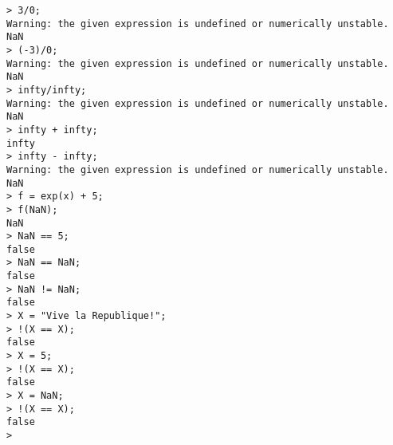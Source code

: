 \begin{center}\begin{minipage}{15cm}\begin{Verbatim}[frame=single]
> 3/0;
Warning: the given expression is undefined or numerically unstable.
NaN
> (-3)/0;
Warning: the given expression is undefined or numerically unstable.
NaN
> infty/infty;
Warning: the given expression is undefined or numerically unstable.
NaN
> infty + infty;
infty
> infty - infty;
Warning: the given expression is undefined or numerically unstable.
NaN
> f = exp(x) + 5;
> f(NaN);
NaN
> NaN == 5;
false
> NaN == NaN;
false
> NaN != NaN;
false
> X = "Vive la Republique!";
> !(X == X);
false
> X = 5;
> !(X == X);
false
> X = NaN;
> !(X == X);
false
> 
\end{Verbatim}
\end{minipage}\end{center}
